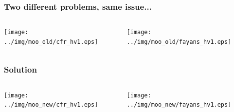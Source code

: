 \documentclass[aspectratio=169]{beamer}
\begin{document}
\begin{frame}\frametitle{Two different problems, same issue...}
\begin{columns}
\begin{column}{0.5\textwidth}
\texttt{[image: ../img/moo\_old/cfr\_hv1.eps]}
\end{column}
\begin{column}{0.5\textwidth}
\texttt{[image: ../img/moo\_old/fayans\_hv1.eps]}
\end{column}
\end{columns}
\end{frame}

\begin{frame}\frametitle{Solution}
\begin{columns}
\begin{column}{0.5\textwidth}
\texttt{[image: ../img/moo\_new/cfr\_hv1.eps]}
\end{column}
\begin{column}{0.5\textwidth}
\texttt{[image: ../img/moo\_new/fayans\_hv1.eps]}
\end{column}
\end{columns}
\end{frame}
\end{document}
